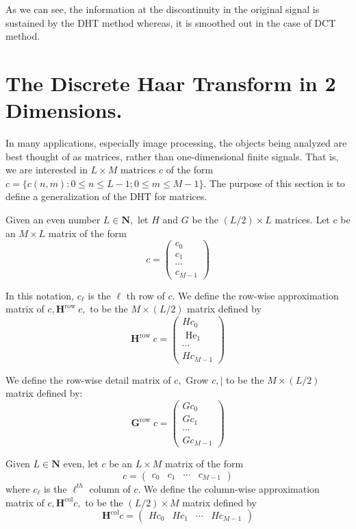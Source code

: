 As we can see, the information at the discontinuity in the original signal is sustained by the DHT method whereas, it is smoothed out in the case of DCT method.  

\section{The Discrete Haar Transform in 2 Dimensions.}
\label{sec5}

In many applications, especially image processing, the objects being analyzed are best thought of as matrices, rather than one-dimensional finite signals. That is, we are interested in $L \times M$ matrices $c$ of the form $c=\{c(n, m): 0 \leq n \leq L-1 ; 0 \leq m \leq M-1\} .$ The purpose of this section is to define a generalization of the DHT for matrices.

Given an even number $L \in \mathbf{N},$ let $H$ and $G$ be the $(L / 2) \times L$ matrices. Let $c$ be an $M \times L$ matrix of the form
$$
c=\left(\begin{array}{c}{c_{0}} \\ {c_{1}} \\ {\cdots} \\ {c_{M-1}}\end{array}\right)
$$

In this notation, $c_{\ell}$ is the $\ell$ th row of $c .$ We define the row-wise approximation matrix of $c, \mathbf{H}^{\text {row }} c,$ to be the $M \times(L / 2)$ matrix defined by
$$
\mathbf{H}^{\text {row }} c=\left(\begin{array}{c}{H c_{0}} \\ {\text { He}_{1}} \\ {\cdots} \\ {H c_{M-1}}\end{array}\right)
$$

We define the row-wise detail matrix of $c,$ Grow $c, |$ to be the $M \times(L / 2)$
matrix defined by:
$$
\mathbf{G}^{\text {row }} c=\left(\begin{array}{c}{G c_{0}} \\ {G c_{1}} \\ {\cdots} \\ {G c_{M-1}}\end{array}\right)
$$


Given $L \in \mathbf{N}$ even, let $c$ be an $L \times M$ matrix of the form
$$
c=\left(\begin{array}{cccc}{c_{0}} & {c_{1}} & {\cdots} & {c_{M-1}}\end{array}\right)
$$
where $c_{\ell}$ is the $\ell^{t h}$ column of $c$. We define the column-wise approximation matrix of $c, \mathbf{H}^{\operatorname{col}} c,$ to be the $(L / 2) \times M$ matrix defined by
$$
\mathbf{H}^{\operatorname{col}} c=\left(\begin{array}{cccc}{H c_{0}} & {H c_{1}} & {\cdots} & {H c_{M-1}}\end{array}\right)
$$

